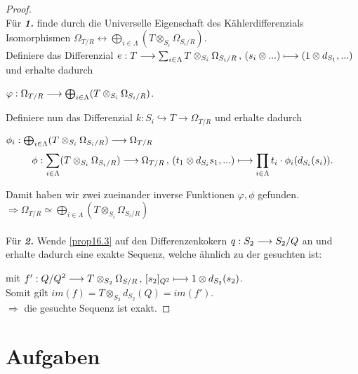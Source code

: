 \documentclass[10pt,a4paper]{report}
\newcommand{\functionfront}[3]{\nolinebreak{#1:#2 \longrightarrow #3}}
\newcommand{\function}[5]{\nolinebreak{#1:#2 \longrightarrow #3 \, , \, #4 \longmapsto #5}}
\newcommand{\divR}[2]{\Omega_{#1/#2}}
\newcommand{\Tensor}[3]{#1 \otimes_{#2} #3}
\newcommand{\tensor}[3]{#1 \otimes #3}
\newcommand{\immage}[1]{im(#1)}
\begin{document}
\begin{proof}\ \\
Für \textit{\textbf{1.}} finde durch die Universelle Eigenschaft des Kählerdifferenzials Isomorphismen $ \divR{T}{R} \longleftrightarrow \bigoplus_{i \in \Lambda} ( \Tensor{T}{S_i}{\divR{S_i}{R}} )$.\\
Definiere das Differenzial $\function{e}{T}{\sum_{i \in \Lambda} \Tensor{T}{S_i}{\divR{S_i}{R}}}{(\tensor{s_i}{R}{...})}{(\tensor{1}{S_i}{d_{S_1},...)}}$ und erhalte dadurch
\begin{center}
$\functionfront{\varphi}{\divR{T}{R}}{\bigoplus_{i\in \Lambda} ( \Tensor{T}{S_i}{\divR{S_i}{R}} )}$.
\end{center}
Definiere nun das Differenzial $k: S_i \hookrightarrow T \longrightarrow \divR{T}{R}$ und erhalte dadurch
\begin{center}
$\functionfront{\phi_i}{\bigoplus_{i\in \Lambda} ( \Tensor{T}{S_i}{\divR{S_i}{R}} )}{\divR{T}{R}}$\\
\begin{gather*}
\function{\phi}{\sum_{i\in \Lambda} ( \Tensor{T}{S_i}{\divR{S_i}{R}})}{\divR{T}{R}}{(\tensor{t_1}{S_1}{d_{S_i}s_1},...)}{\prod_{i\in \Lambda} t_i \cdot \phi_i(d_{S_i}(s_i))}. 
\end{gather*}
\end{center}
Damit haben wir zwei zueinander inverse Funktionen $\varphi ,\phi$ gefunden.\\
$\Rightarrow \divR{T}{R} \simeq \bigoplus_{i\in \Lambda} ( \Tensor{T}{S_i}{\divR{S_i}{R}} )$\\
\ \\
Für \textit{\textbf{2.}} Wende \cref{prop16.3} auf den Differenzenkokern $\functionfront{q}{S_2}{S_2/Q}$ an und erhalte dadurch eine exakte Sequenz, welche ähnlich zu der gesuchten ist:
\begin{center}
\end{center}
mit $\function{f'}{Q/Q^2}{{\Tensor{T}{S_2}{\divR{S}{R}}}}{[s_2]_{Q^2}}{\tensor{1}{S_2}{d_{S_2}(s_2)}}$.\\
Somit gilt $\immage{f} = \Tensor{T}{S_2}{d_{S_2}(Q)} = \immage{f'}$.\\
$\Rightarrow$ die gesuchte Sequenz ist exakt.
\end{proof}

\chapter{Aufgaben}
\end{document}
